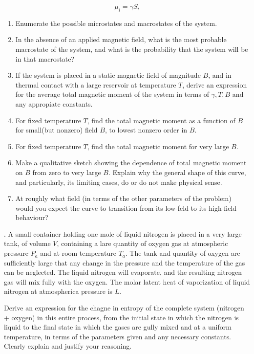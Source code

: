 \documentclass[11pt]{article}
\begin{document}
\begin{displaymath}
  \mu_i = \gamma S_i
\end{displaymath}
\begin{enumerate}
	\item Enumerate the possible microstates and macrostates of the system.
	\item In the absence of an applied magnetic field, what is the most probable macrostate of the system, and what is the probability that the system will be in that macrostate?
	\item If the system is placed in a static magnetic field of magnitude $B$, and in thermal contact with a large reservoir at temperature $T$, derive an expression for the average total magnetic moment of the system in terms of $\gamma, T, B$ and any appropiate constants.
	\item For fixed temperature $T$, find the total magnetic moment as a function of $B$ for small(but nonzero) field $B$, to lowest nonzero order in $B$.
	\item For fixed temperature $T$, find the total magnetic moment for very large $B$.
	\item Make a qualitative sketch showing the dependence of total magnetic moment on $B$ from zero to very large $B$. Explain why the general shape of this curve, and particularly, its limiting cases, do or do not make physical sense.
	\item At roughly what field (in terms of the other parameters of the problem) would you expect the curve to transition from its low-feld to its high-field behaviour?
\end{enumerate}
. A small container holding one mole of liquid nitrogen is placed in a very large tank, of volume $V$, containing a lare quantity of oxygen gas at atmospheric pressure $P_a$ and at room temperature $T_a$. The tank and quantity of oxygen are sufficiently large that any change in the pressure and the temperature of the gas can be neglected. The liquid nitrogen will evaporate, and the resulting nitrogen gas will mix fully with the oxygen. The molar latent heat of vaporization of liquid nitrogen at atmospherica pressure is $L$.

Derive an expression for the chagne in entropy of the complete system (nitrogen + oxygen) in this entire process, from the initial state in which the nitrogen is liquid to the final state in which the gases are gully mixed and at a uniform temperature, in terms of the parameters given and any necessary constants. Clearly explain and justify your reasoning.
\end{document}
